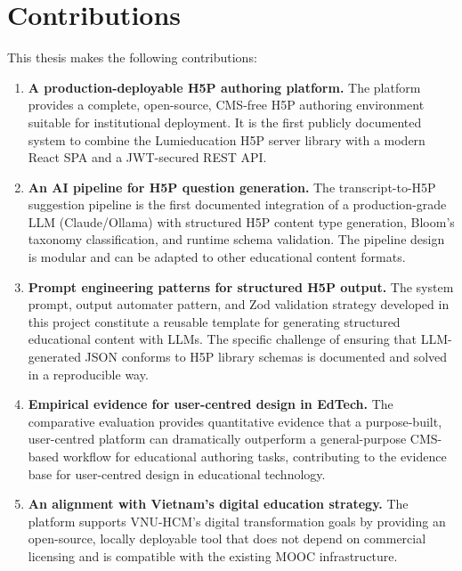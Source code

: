 \section{Contributions}

This thesis makes the following contributions:

\begin{enumerate}
  \item \textbf{A production-deployable H5P authoring platform.} The
  platform provides a complete, open-source, CMS-free H5P authoring
  environment suitable for institutional deployment. It is the first
  publicly documented system to combine the Lumieducation H5P server
  library with a modern React SPA and a JWT-secured REST API.

  \item \textbf{An AI pipeline for H5P question generation.} The
  transcript-to-H5P suggestion pipeline is the first documented integration
  of a production-grade LLM (Claude/Ollama) with structured H5P content
  type generation, Bloom's taxonomy classification, and runtime schema
  validation. The pipeline design is modular and can be adapted to other
  educational content formats.

  \item \textbf{Prompt engineering patterns for structured H5P output.}
  The system prompt, output automater pattern, and Zod validation strategy
  developed in this project constitute a reusable template for generating
  structured educational content with LLMs. The specific challenge of
  ensuring that LLM-generated JSON conforms to H5P library schemas is
  documented and solved in a reproducible way.

  \item \textbf{Empirical evidence for user-centred design in EdTech.}
  The comparative evaluation provides quantitative evidence that a
  purpose-built, user-centred platform can dramatically outperform a
  general-purpose CMS-based workflow for educational authoring tasks,
  contributing to the evidence base for user-centred design in educational
  technology.

  \item \textbf{An alignment with Vietnam's digital education strategy.}
  The platform supports VNU-HCM's digital transformation goals by providing
  an open-source, locally deployable tool that does not depend on commercial
  licensing and is compatible with the existing MOOC infrastructure.
\end{enumerate}

